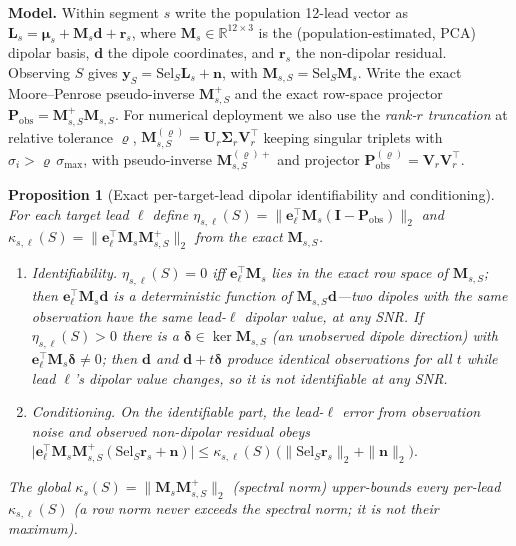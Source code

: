 
\newtheorem{theoremc}{Proposition}
\newtheorem{propc}[theoremc]{Proposition}

\noindent\textbf{Model.} Within segment $s$ write the population 12-lead vector as
$\bm L_s = \bm\mu_s + \bm M_s\bm d + \bm r_s$, where $\bm M_s\in\mathbb R^{12\times3}$
is the (population-estimated, PCA) dipolar basis, $\bm d$ the dipole coordinates, and
$\bm r_s$ the non-dipolar residual. Observing $S$ gives $\bm y_S=\bm{\mathrm{Sel}}_S\bm L_s
+\bm n$, with $\bm M_{s,S}=\bm{\mathrm{Sel}}_S\bm M_s$. Write the exact Moore--Penrose
pseudo-inverse $\bm M_{s,S}^{+}$ and the exact row-space projector
$\bm P_{\mathrm{obs}}=\bm M_{s,S}^{+}\bm M_{s,S}$. For numerical deployment we also use the
\emph{rank-$r$ truncation} at relative tolerance $\varrho$,
$\bm M_{s,S}^{(\varrho)}=\bm U_r\bm\Sigma_r\bm V_r^{\top}$ keeping singular triplets with
$\sigma_i>\varrho\,\sigma_{\max}$, with pseudo-inverse $\bm M_{s,S}^{(\varrho)+}$ and projector
$\bm P_{\mathrm{obs}}^{(\varrho)}=\bm V_r\bm V_r^{\top}$.

\begin{theoremc}[Exact per-target-lead dipolar identifiability and conditioning]
\label{thm:perlead}
For each target lead $\ell$ define
$\eta_{s,\ell}(S)=\big\|\bm e_\ell^{\top}\bm M_s(\bm I-\bm P_{\mathrm{obs}})\big\|_2$ and
$\kappa_{s,\ell}(S)=\big\|\bm e_\ell^{\top}\bm M_s\bm M_{s,S}^{+}\big\|_2$ from the \emph{exact}
$\bm M_{s,S}$.
\begin{enumerate}
\item[(i)] \emph{Identifiability.} $\eta_{s,\ell}(S)=0$ iff $\bm e_\ell^{\top}\bm M_s$ lies in
the exact row space of $\bm M_{s,S}$; then $\bm e_\ell^{\top}\bm M_s\bm d$ is a deterministic
function of $\bm M_{s,S}\bm d$---two dipoles with the same observation have the same lead-$\ell$
dipolar value, at any SNR. If $\eta_{s,\ell}(S)>0$ there is a $\bm\delta\in\ker\bm M_{s,S}$
(an unobserved dipole direction) with $\bm e_\ell^{\top}\bm M_s\bm\delta\neq0$; then $\bm d$ and
$\bm d+t\bm\delta$ produce identical observations for all $t$ while lead $\ell$'s dipolar value
changes, so it is not identifiable at any SNR.
\item[(ii)] \emph{Conditioning.} On the identifiable part, the lead-$\ell$ error from
observation noise and observed non-dipolar residual obeys
$\big|\bm e_\ell^{\top}\bm M_s\bm M_{s,S}^{+}(\bm{\mathrm{Sel}}_S\bm r_s+\bm n)\big|
\le \kappa_{s,\ell}(S)\,\big(\|\bm{\mathrm{Sel}}_S\bm r_s\|_2+\|\bm n\|_2\big).$
\end{enumerate}
The global $\kappa_s(S)=\|\bm M_s\bm M_{s,S}^{+}\|_2$ (spectral norm) upper-bounds every per-lead
$\kappa_{s,\ell}(S)$ (a row norm never exceeds the spectral norm; it is not their maximum).
\end{theoremc}


